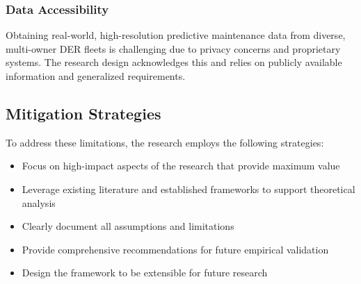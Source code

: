 \subsubsection{Data Accessibility}
Obtaining real-world, high-resolution predictive maintenance data from diverse, multi-owner DER fleets is challenging due to privacy concerns and proprietary systems. The research design acknowledges this and relies on publicly available information and generalized requirements.

\subsection{Mitigation Strategies}

To address these limitations, the research employs the following strategies:
\begin{itemize}
    \item Focus on high-impact aspects of the research that provide maximum value
    \item Leverage existing literature and established frameworks to support theoretical analysis
    \item Clearly document all assumptions and limitations
    \item Provide comprehensive recommendations for future empirical validation
    \item Design the framework to be extensible for future research
\end{itemize}
